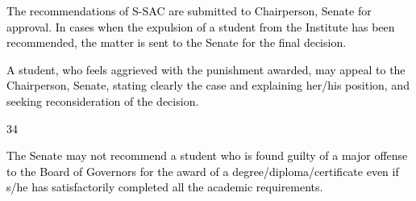 \documentclass[12pt]{article}
\begin{document}
\vspace{\baselineskip}
\begin{justify}
{\fontsize{10pt}{12.0pt}\selectfont \textcolor[HTML]{00000A}{The recommendations of S-SAC are submitted to Chairperson, Senate for approval. In cases when the expulsion of a student from the Institute has been recommended, the matter is sent to the Senate for the final decision.}\par}
\end{justify}\par


\vspace{\baselineskip}
\begin{justify}
{\fontsize{10pt}{12.0pt}\selectfont \textcolor[HTML]{00000A}{A student, who feels aggrieved with the punishment awarded, may appeal to the Chairperson, Senate, stating clearly the case and explaining her/his position, and seeking reconsideration of the decision.}\par}
\end{justify}\par


\vspace{\baselineskip}
\begin{Center}
\textcolor[HTML]{00000A}{34}
\end{Center}\par


\vspace{\baselineskip}
{\fontsize{10pt}{12.0pt}\selectfont \textcolor[HTML]{00000A}{The Senate may not recommend a student who is found guilty of a major offense to the Board of Governors for the award of a degree/diploma/certificate even if s/he has satisfactorily completed all the academic requirements.}\par}\par


\vspace{\baselineskip}

\vspace{\baselineskip}

\vspace{\baselineskip}

\vspace{\baselineskip}

\vspace{\baselineskip}

\vspace{\baselineskip}

\vspace{\baselineskip}
\end{document}
